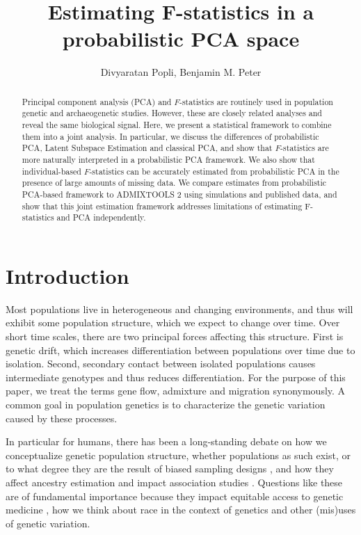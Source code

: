 \documentclass[12pt]{article}
\title{Estimating F-statistics in a probabilistic PCA space}
\author{Divyaratan Popli, Benjamin M. Peter}
\begin{document}
\maketitle


\begin{abstract}

\noindent Principal component analysis (PCA) and $F$-statistics are routinely used in population genetic and archaeogenetic studies. However, these are closely related analyses and reveal the same biological signal. Here, we present a statistical framework to combine them into a joint analysis. In particular, we discuss the differences of probabilistic PCA, Latent Subspace Estimation and classical PCA, and show that $F$-statistics are more naturally interpreted in a probabilistic PCA framework. We also show that individual-based $F$-statistics can be accurately estimated from probabilistic PCA in the presence of large amounts of missing data. We compare estimates from probabilistic PCA-based framework to ADMIXTOOLS 2 using simulations and published data, and show that this joint estimation framework addresses limitations of estimating F-statistics and PCA independently.

\end{abstract}

\section{Introduction}

Most populations live in heterogeneous and changing environments, and thus will exhibit some population structure, which we expect to change over time. Over short time scales, there are two principal forces affecting this structure. First is genetic drift, which increases differentiation between populations over time due to isolation. Second, secondary contact between isolated populations causes intermediate genotypes and thus reduces differentiation. For the purpose of this paper, we treat the terms gene flow, admixture and migration synonymously. A common goal in population genetics is to characterize the genetic variation caused by these processes.

In particular for humans, there has been a long-standing debate on how we conceptualize genetic population structure, whether populations as such exist, or to what degree they are the result of biased sampling designs \citep{serre_evidence_2004, rosenberg_clines_2005, peter_genetic_2020}, and how they affect ancestry estimation \citep{mathieson_what_2020, simon_contribution_2023} and impact association studies \citep{price_principal_2006}. Questions like these are of fundamental importance because they impact equitable access to genetic medicine \citep{popejoy_genomics_2016}, how we think about race in the context of genetics \citep{lewontin_apportionment_1972, novembre_background_2022} and other (mis)uses of genetic variation.
\end{document}

